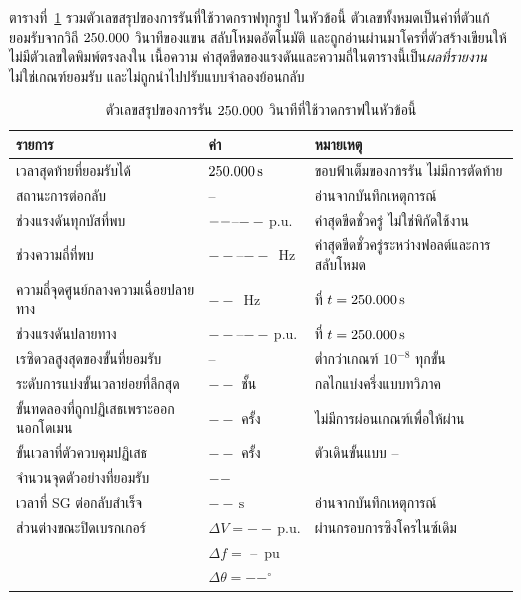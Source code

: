 \documentclass[12pt,a4paper]{article}
\newcommand{\pu}{\,\mathrm{p.u.}}
\newcommand{\second}{\,\mathrm{s}}
\newcommand{\NewRunVMax}{--}\newcommand{\NewRunFMin}{--}%
\newcommand{\NewRunFMax}{--}\newcommand{\NewRunSubdivision}{--}%
\newcommand{\NewRunDomainRejects}{--}\newcommand{\NewRunResidual}{--}%
\newcommand{\NewRunReclose}{--}\newcommand{\NewRunFirstRelease}{--}%
\newcommand{\NewRunSyncDV}{--}\newcommand{\NewRunSyncDF}{--}%
\newcommand{\NewRunSyncDTheta}{--}\newcommand{\NewRunRecloseStatus}{--}%
\newcommand{\NewRunRejectedSteps}{--}\newcommand{\NewRunTerminalF}{--}%
\newcommand{\NewRunTerminalVMin}{--}\newcommand{\NewRunTerminalVMax}{--}%
\newcommand{\NewRunStepper}{--}\newcommand{\NewRunReselection}{--}%
\begin{document}
ตารางที่~\ref{tab:runscalars} รวมตัวเลขสรุปของการรันที่ใช้วาดกราฟทุกรูป
ในหัวข้อนี้ ตัวเลขทั้งหมดเป็นค่าที่ตัวแก้ยอมรับจากวิถี $250.000$ วินาทีของแขน
สลับโหมดอัตโนมัติ และถูกอ่านผ่านมาโครที่ตัวสร้างเขียนให้ ไม่มีตัวเลขใดพิมพ์ตรงลงใน
เนื้อความ ค่าสุดขีดของแรงดันและความถี่ในตารางนี้เป็น\emph{ผลที่รายงาน}
ไม่ใช่เกณฑ์ยอมรับ และไม่ถูกนำไปปรับแบบจำลองย้อนกลับ

\begin{table}[H]
\centering\footnotesize
\caption{ตัวเลขสรุปของการรัน $250.000$ วินาทีที่ใช้วาดกราฟในหัวข้อนี้}
\label{tab:runscalars}
\begin{tabularx}{\textwidth}{@{}>{\raggedright\arraybackslash}p{}l X@{}}
\toprule
รายการ & ค่า & หมายเหตุ \\ \midrule
เวลาสุดท้ายที่ยอมรับได้ & $\NewRunEnd\second$ & ขอบฟ้าเต็มของการรัน ไม่มีการตัดท้าย \\
สถานะการต่อกลับ & \NewRunRecloseStatus & อ่านจากบันทึกเหตุการณ์ \\
ช่วงแรงดันทุกบัสที่พบ & $--$--$\NewRunVMax\pu$ & ค่าสุดขีดชั่วครู่ ไม่ใช่พิกัดใช้งาน \\
ช่วงความถี่ที่พบ & $\NewRunFMin$--$\NewRunFMax$~Hz & ค่าสุดขีดชั่วครู่ระหว่างฟอลต์และการสลับโหมด \\
ความถี่จุดศูนย์กลางความเฉื่อยปลายทาง & $\NewRunTerminalF$~Hz & ที่ $t=\NewRunEnd\second$ \\
ช่วงแรงดันปลายทาง & $\NewRunTerminalVMin$--$\NewRunTerminalVMax\pu$ & ที่ $t=\NewRunEnd\second$ \\
เรซิดวลสูงสุดของขั้นที่ยอมรับ & \NewRunResidual & ต่ำกว่าเกณฑ์ $10^{-8}$ ทุกขั้น \\
ระดับการแบ่งขั้นเวลาย่อยที่ลึกสุด & $\NewRunSubdivision$ ชั้น & กลไกแบ่งครึ่งแบบทวิภาค \\
ขั้นทดลองที่ถูกปฏิเสธเพราะออกนอกโดเมน & $\NewRunDomainRejects$ ครั้ง & ไม่มีการผ่อนเกณฑ์เพื่อให้ผ่าน \\
ขั้นเวลาที่ตัวควบคุมปฏิเสธ & $\NewRunRejectedSteps$ ครั้ง & ตัวเดินขั้นแบบ \NewRunStepper \\
จำนวนจุดตัวอย่างที่ยอมรับ & $--$ & \\
เวลาที่ SG ต่อกลับสำเร็จ & $\NewRunReclose\second$ & อ่านจากบันทึกเหตุการณ์ \\
ส่วนต่างขณะปิดเบรกเกอร์ & $\Delta V=\NewRunSyncDV\pu$ & ผ่านกรอบการซิงโครไนซ์เดิม \\
 & $\Delta f=$ \NewRunSyncDF\ pu & \\
 & $\Delta\theta=\NewRunSyncDTheta^{\circ}$ & \\

\end{tabularx}
\end{table}
\end{document}
